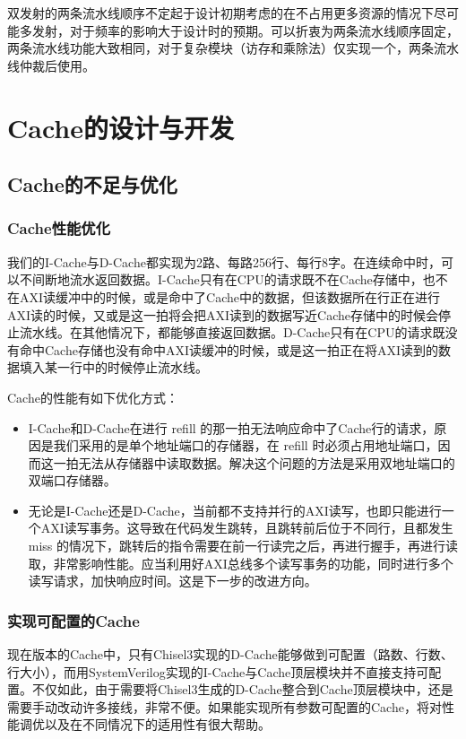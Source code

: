 双发射的两条流水线顺序不定起于设计初期考虑的在不占用更多资源的情况下尽可能多发射，对于频率的影响大于设计时的预期。可以折衷为两条流水线顺序固定，两条流水线功能大致相同，对于复杂模块（访存和乘除法）仅实现一个，两条流水线仲裁后使用。

\section{Cache的设计与开发}

\subsection{Cache的不足与优化}

\subsubsection{Cache性能优化}

我们的I-Cache与D-Cache都实现为2路、每路256行、每行8字。在连续命中时，可以不间断地流水返回数据。I-Cache只有在CPU的请求既不在Cache存储中，也不在AXI读缓冲中的时候，或是命中了Cache中的数据，但该数据所在行正在进行AXI读的时候，又或是这一拍将会把AXI读到的数据写近Cache存储中的时候会停止流水线。在其他情况下，都能够直接返回数据。D-Cache只有在CPU的请求既没有命中Cache存储也没有命中AXI读缓冲的时候，或是这一拍正在将AXI读到的数据填入某一行中的时候停止流水线。

Cache的性能有如下优化方式：
\begin{itemize}
    \item I-Cache和D-Cache在进行 refill 的那一拍无法响应命中了Cache行的请求，原因是我们采用的是单个地址端口的存储器，在 refill 时必须占用地址端口，因而这一拍无法从存储器中读取数据。解决这个问题的方法是采用双地址端口的双端口存储器。
    \item 无论是I-Cache还是D-Cache，当前都不支持并行的AXI读写，也即只能进行一个AXI读写事务。这导致在代码发生跳转，且跳转前后位于不同行，且都发生 miss 的情况下，跳转后的指令需要在前一行读完之后，再进行握手，再进行读取，非常影响性能。应当利用好AXI总线多个读写事务的功能，同时进行多个读写请求，加快响应时间。这是下一步的改进方向。
\end{itemize}

\subsubsection{实现可配置的Cache}

现在版本的Cache中，只有Chisel3实现的D-Cache能够做到可配置（路数、行数、行大小），而用SystemVerilog实现的I-Cache与Cache顶层模块并不直接支持可配置。不仅如此，由于需要将Chisel3生成的D-Cache整合到Cache顶层模块中，还是需要手动改动许多接线，非常不便。如果能实现所有参数可配置的Cache，将对性能调优以及在不同情况下的适用性有很大帮助。

